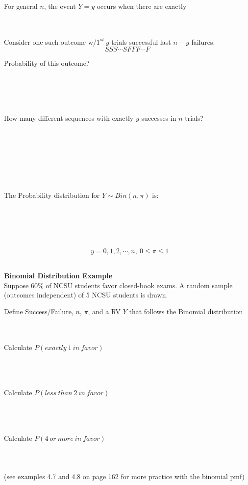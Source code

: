 For general $n$, the event $Y=y$ occurs when there are exactly \\~\\~\\
\bi
\item Consider one such outcome w/$1^{st}~y$ trials successful last $n-y$ failures:
$$SSS\cdots SFFF\cdots  F$$
\item Probability of this outcome?\\~\\~\\~\\~\\
\item How many different sequences with exactly $y$ successes in $n$ trials? \\~\\~\\~\\~\\~\\~\\~\\
\ei
\large The Probability distribution for $Y\sim Bin(n,\pi)$ is:\\~\\~\\~\\~\\~\\
$$ ~~~ y=0,1,2,\cdots,n, ~ 0 \leq \pi \leq 1$$~\\

\pagebreak

\textbf{Binomial Distribution Example}\\
Suppose 60\% of NCSU students favor closed-book exams. A random sample (outcomes independent) of 5 NCSU students is drawn.
\be
\item Define Success/Failure, $n$, $\pi$, and a RV $Y$ that follows the Binomial distribution\\~\\~\\
\item Calculate $P(exactly~1~in~favor)$\\~\\~\\~\\
\item Calculate $P(less~than~2~in~favor)$\\~\\~\\~\\
\item Calculate $P(4~or~more~in~favor)$\\~\\~\\~\\
\ee
(see examples 4.7 and 4.8 on page 162 for more practice with the binomial pmf)\\~\\


